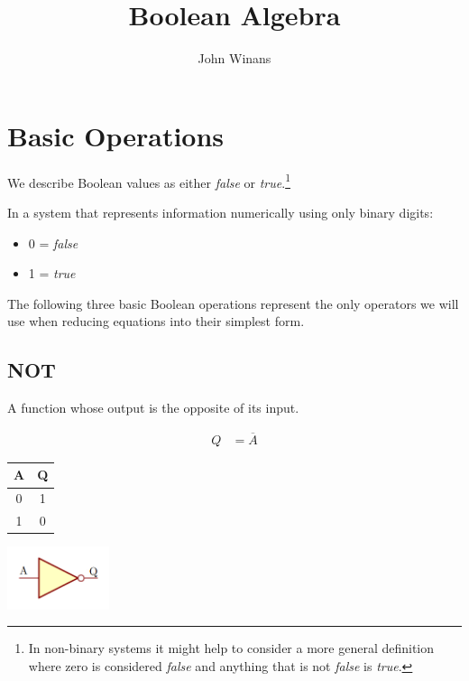 \documentclass[10pt]{article}
\begin{document}

\title{Boolean Algebra}
\author{John Winans}
\maketitle
\thispagestyle{fancy}


\section{Basic Operations}

We describe Boolean values as either {\em false} or {\em true}.\footnote{
In non-binary systems it might help to consider a more general definition where 
zero is considered {\em false} and anything that is not {\em false} is {\em true}.}

In a system that represents information numerically using only binary digits:

\begin{itemize}
\item 0 = {\em false}
\item 1 = {\em true}
\end{itemize}



The following three basic Boolean operations represent the only operators we 
will use when reducing equations into their simplest form.

\subsection{NOT}

A function whose output is the opposite of its input.

\begin{align}
Q &= \overline{A}
\end{align}

\begin{center}
\begin{tabular}{|c|c|}
\hline
A & Q \\
\hline
0 & 1 \\
1 & 0 \\
\hline
\end{tabular}

\includegraphics[width=3cm]{not.png}
\end{center}
\end{document}
